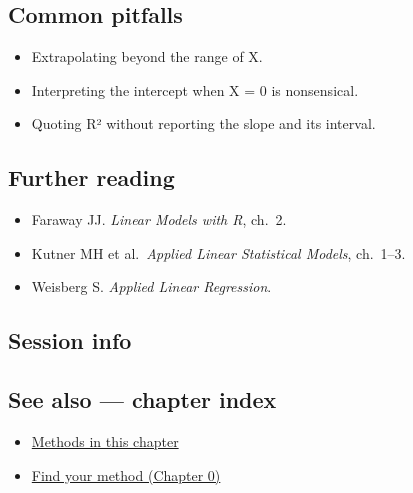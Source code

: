 \documentclass[
]{article}
\newenvironment{Shaded}{\begin{snugshade}}{\end{snugshade}}
\providecommand{\tightlist}{%
  \setlength{\itemsep}{0pt}\setlength{\parskip}{0pt}}
\begin{document}
\subsection{Common pitfalls}\label{common-pitfalls}

\begin{itemize}
\tightlist
\item
  Extrapolating beyond the range of X.
\item
  Interpreting the intercept when X = 0 is nonsensical.
\item
  Quoting R² without reporting the slope and its interval.
\end{itemize}

\subsection{Further reading}\label{further-reading}

\begin{itemize}
\tightlist
\item
  Faraway JJ. \emph{Linear Models with R}, ch.~2.
\item
  Kutner MH et al.~\emph{Applied Linear Statistical Models}, ch.~1--3.
\item
  Weisberg S. \emph{Applied Linear Regression}.
\end{itemize}

\subsection{Session info}\label{session-info}

\begin{Shaded}
\begin{Highlighting}[]

\end{Highlighting}
\end{Shaded}

\subsection{See also --- chapter index}\label{see-also-chapter-index}

\begin{itemize}
\tightlist
\item
  \href{../index.Rmd}{Methods in this chapter}
\item
  \href{../../../ch00-find-your-method.Rmd}{Find your method (Chapter
  0)}
\end{itemize}
\end{document}
